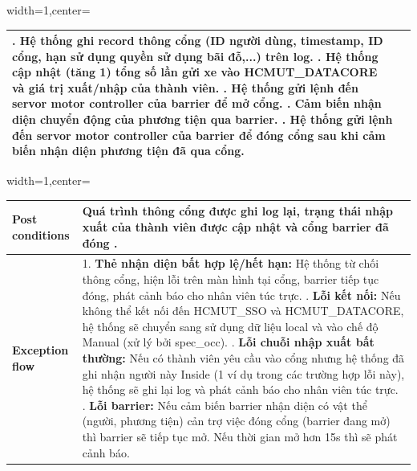 \begin{adjustbox}{width=1\textwidth,center=\textwidth}
\begin{tabular}{|>{\centering\arraybackslash}m{3.5cm}|m{13.2cm}|}
5. Hệ thống ghi record thông cổng (ID người dùng, timestamp, ID cổng, hạn sử dụng quyền sử dụng bãi đỗ,...) trên log. \newline
6. Hệ thống cập nhật (tăng 1) tổng số lần gửi xe vào HCMUT\_DATACORE và giá trị xuất/nhập của thành viên. \newline
7. Hệ thống gửi lệnh đến servor motor controller của barrier để mở cổng. \newline
8. Cảm biến nhận diện chuyển động của phương tiện qua barrier. \newline
9. Hệ thống gửi lệnh đến servor motor controller của barrier để đóng cổng sau khi cảm biến nhận diện phương tiện đã qua cổng. \\ \hline
\end{tabular}
\end{adjustbox}

\begin{adjustbox}{width=1\textwidth,center=\textwidth}
\small
\begin{tabular}{|>{\centering\arraybackslash}m{3.5cm}|m{13.2cm}|}
\hline
\textbf{Post conditions} & Quá trình thông cổng được ghi log lại, trạng thái nhập xuất của thành viên được cập nhật và cổng barrier đã đóng . \\ \hline
\textbf{Exception flow} & 
1. \textbf{Thẻ nhận diện bất hợp lệ/hết hạn:} Hệ thống từ chối thông cổng, hiện lỗi trên màn hình tại cổng, barrier tiếp tục đóng, phát cảnh báo cho nhân viên túc trực. \newline
2. \textbf{Lỗi kết nối:} Nếu không thể kết nối đến HCMUT\_SSO và HCMUT\_DATACORE, hệ thống sẽ chuyển sang sử dụng dữ liệu local và vào chế độ Manual (xử lý bởi spec\_occ). \newline
3. \textbf{Lỗi chuỗi nhập xuất bất thường:} Nếu có thành viên yêu cầu vào cổng nhưng hệ thống đã ghi nhận người này Inside (1 ví dụ trong các trường hợp lỗi này), hệ thống sẽ ghi lại log và phát cảnh báo cho nhân viên túc trực. \newline
4. \textbf{Lỗi barrier:} Nếu cảm biến barrier nhận diện có vật thể (người, phương tiện) cản trợ việc đóng cổng (barrier đang mở) thì barrier sẽ tiếp tục mở. Nếu thời gian mở hơn 15s thì sẽ phát cảnh báo. \\ \hline
\end{tabular}
\end{adjustbox}